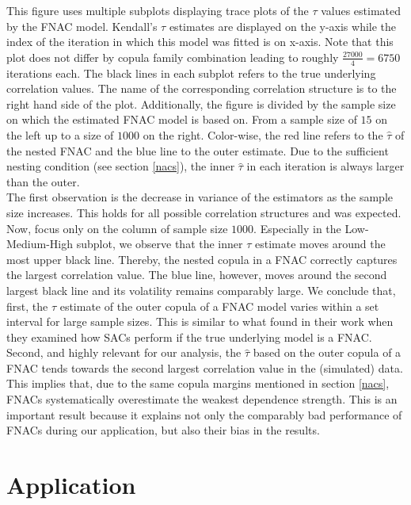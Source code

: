 \documentclass[
]{krantz}
\begin{document}
This figure uses multiple subplots displaying trace plots of the \(\tau\) values estimated by the FNAC model.
Kendall's \(\tau\) estimates are displayed on the y-axis while the index
of the iteration in which this model was fitted is on x-axis. Note that this plot does not differ by
copula family combination leading to roughly \(\frac{27000}{4} = 6750\) iterations each.
The black lines in each subplot refers to the true underlying correlation values.
The name of the corresponding
correlation structure is to the right hand side of the plot.
Additionally, the figure is divided by the sample size on which the estimated FNAC model is based on. From a
sample size of \(15\) on the left up to a size of \(1000\) on the right.
Color-wise, the red line refers to the \(\hat{\tau}\) of the nested FNAC and the blue line to the outer estimate.
Due to the sufficient nesting condition (see section \ref{nacs}), the inner \(\hat{\tau}\) in each iteration is always larger than the outer.\\
The first observation is the decrease in variance of the estimators as the sample size increases. This holds for
all possible correlation structures and was expected.
Now, focus only on the column of sample size \(1000\). Especially in the Low-Medium-High subplot,
we observe that the inner \(\tau\) estimate moves around the most upper black line.
Thereby, the nested copula in a FNAC correctly captures the largest correlation value.
The blue line, however, moves around the second largest black line and its volatility remains comparably large.
We conclude that, first, the \(\tau\) estimate of the outer copula of a FNAC model varies within a set interval
for large sample sizes. This is similar to what \citet{grimaldi2006} found in their work when they examined
how SACs perform if the true underlying model is a FNAC.
Second, and highly relevant for our analysis,
the \(\hat{\tau}\) based on the outer copula of a FNAC
tends towards the second largest correlation value in the (simulated) data.
This implies that, due to the same copula margins mentioned in section \ref{nacs}, FNACs systematically
overestimate the weakest dependence strength.
This is an important result because it explains not only the comparably bad performance of FNACs during our
application, but also their bias in the results.

\section{Application}\label{app}
\end{document}
